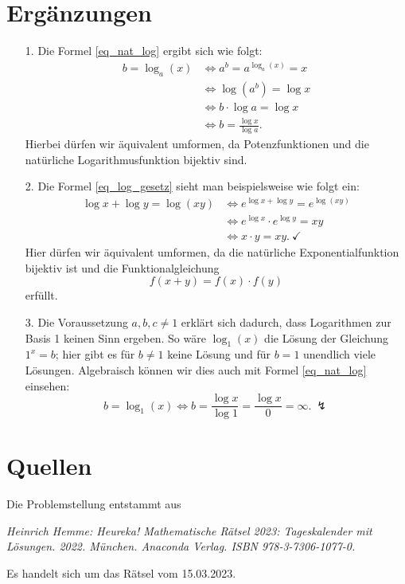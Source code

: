 \documentclass[]{scrartcl}
\begin{document}
\section*{Ergänzungen}
\begin{itemize}
	\item[1.]
	{
	Die Formel \eqref{eq_nat_log} ergibt sich wie folgt:
	\begin{align*}
		b = \log_a(x) 
		& \Leftrightarrow
		a^b = a^{\log_a(x)} = x
		\\ & \Leftrightarrow
		\log(a^b) =\log x
		\\ & \Leftrightarrow
		b \cdot \log a = \log x
		\\ & \Leftrightarrow
		b = \frac{\log x}{\log a}.
	\end{align*}
	Hierbei dürfen wir äquivalent umformen, da Potenzfunktionen 
	und die natürliche Logarithmusfunktion bijektiv sind.
	}
	\item[2.]
	{
	Die Formel \eqref{eq_log_gesetz} sieht man beispielsweise 
	wie folgt ein:
	\begin{align*}
		\log x + \log y = \log(xy) 
		& \Leftrightarrow
		e^{\log x + \log y} = e^{\log(xy)}
		\\ & \Leftrightarrow
		e^{\log x} \cdot e^{\log y} = xy 
		\\ & \Leftrightarrow
		x \cdot y = xy. ~ \checkmark
	\end{align*}
	Hier dürfen wir äquivalent umformen, da die natürliche 
	Exponentialfunktion bijektiv ist und die Funktionalgleichung
	$$
	f(x+y) = f(x) \cdot f(y)
	$$
	erfüllt.
	}
	\item[3.]
	{
	Die Voraussetzung $a,b,c \neq 1$ erklärt sich dadurch, dass
	Logarithmen zur Basis 1 keinen Sinn ergeben. So wäre 
	$\log_1(x)$ die Lösung der Gleichung $1^x = b$; hier gibt 
	es für $b \neq 1$ keine Lösung und für $b=1$ unendlich viele
	Lösungen.
	\newline 
	Algebraisch können wir dies auch mit Formel \eqref{eq_nat_log}
	einsehen:
	$$
	b = \log_1(x) \Leftrightarrow
	b = \frac{\log x}{\log 1} = \frac{\log x}{0} = \infty. 
	~ \lightning
	$$
	}
\end{itemize}

\section*{Quellen}
Die Problemstellung entstammt aus

\centering
\textit{Heinrich Hemme: Heureka! Mathematische Rätsel 2023: Tageskalender mit Lösungen.
	2022. München. Anaconda Verlag. ISBN 978-3-7306-1077-0.}

\raggedright
Es handelt sich um das Rätsel vom 15.03.2023.
\end{document}
